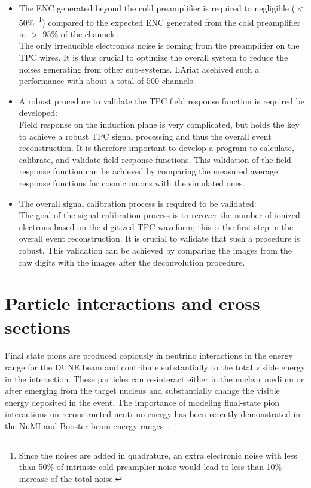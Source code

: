\begin{itemize}
\item The ENC generated beyond the cold preamplifier is required to negligible ($<$ 50\%~\footnote{Since the 
noises are added in quadrature, an extra electronic noise with less than 50\% of intrinsic cold preamplier
noise would lead to less than 10\% increase of the total noise.}) compared to the 
expected ENC generated from the cold preamplifier in $>$ 95\% of the channels: \\
The only irreducible electronics noise is coming from the preamplifier on the TPC wires. It is thus
crucial to optimize the overall system to reduce the noises generating from other sub-systems. 
LAriat acehived such a performance with about a total of 500 channels. 
\item A robust procedure to validate the TPC field response function is required
be developed: \\
Field response on the induction plane is very complicated, but holds the key to achieve a robust TPC 
signal processing and thus the overall event reconstruction. It is therefore important to develop a 
program to calculate, calibrate, and validate field response functions. This validation of the field response function 
can be achieved by comparing the measured average response functions for cosmic muons with the simulated
ones. 
\item The overall signal calibration process is required to be validated: \\
The goal of the signal calibration process is to recover the number of ionized electrons based on
the digitized TPC waveform; this is the first step in the overall event reconstruction. It is crucial to 
validate that such a procedure is robust. This validation can be achieved by comparing the 
images from the raw digits with the images after the deconvolution procedure.
\end{itemize}




\section{Particle interactions and cross sections}



Final state pions are produced copiously in neutrino interactions in the energy range for the DUNE beam  and contribute 
substantially to the total visible energy in the interaction.
These particles can re-interact either in the nuclear medium or after emerging from the target nucleus
and substantially change the visible energy deposited in the event. 
The importance of modeling final-state pion interactions on reconstructed neutrino energy has 
been recently demonstrated in the NuMI and Booster beam energy ranges~\cite{miniboonefsi, minervafsi}. 

